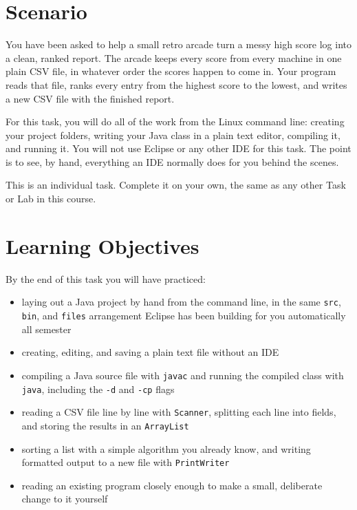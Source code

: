 \documentclass[11pt]{article}
\begin{document}
\AssignmentTitleBlock
\AIDisclaimer

\section{Scenario}

You have been asked to help a small retro arcade turn a messy high score log
into a clean, ranked report. The arcade keeps every score from every machine
in one plain CSV file, in whatever order the scores happen to come in. Your
program reads that file, ranks every entry from the highest score to the
lowest, and writes a new CSV file with the finished report.

For this task, you will do all of the work from the Linux command line:
creating your project folders, writing your Java class in a plain text
editor, compiling it, and running it. You will not use Eclipse or any other
IDE for this task. The point is to see, by hand, everything an IDE normally
does for you behind the scenes.

This is an individual task. Complete it on your own, the same as any other
Task or Lab in this course.

\section{Learning Objectives}

By the end of this task you will have practiced:

\begin{itemize}
  \item laying out a Java project by hand from the command line, in the same
    \texttt{src}, \texttt{bin}, and \texttt{files} arrangement Eclipse has
    been building for you automatically all semester
  \item creating, editing, and saving a plain text file without an IDE
  \item compiling a Java source file with \texttt{javac} and running the
    compiled class with \texttt{java}, including the \texttt{-d} and
    \texttt{-cp} flags
  \item reading a CSV file line by line with \texttt{Scanner}, splitting each
    line into fields, and storing the results in an \texttt{ArrayList}
  \item sorting a list with a simple algorithm you already know, and writing
    formatted output to a new file with \texttt{PrintWriter}
  \item reading an existing program closely enough to make a small,
    deliberate change to it yourself
\end{itemize}
\end{document}
